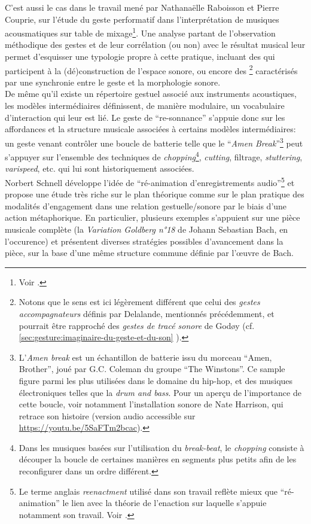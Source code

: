 \indent C'est aussi le cas dans le travail mené par Nathanaëlle Raboisson et Pierre Couprie, sur l'étude du geste performatif dans l'interprétation de musiques acousmatiques sur table de mixage\footnote{Voir \cite{raboisson_experience_2017}.}. Une analyse partant de l'observation méthodique des gestes et de leur corrélation (ou non) avec le résultat musical leur permet d'esquisser une typologie propre à cette pratique, incluant des  qui participent à la (dé)construction de l'espace sonore, ou encore des \footnote{Notons que le sens est ici légèrement différent que celui des \textit{gestes accompagnateurs} définis par Delalande, mentionnés précédemment, et pourrait être rapproché des \textit{gestes de tracé sonore} de Godøy (cf. \ref{sec:gesture:imaginaire-du-geste-et-du-son}
).} caractérisés par une synchronie entre le geste et la morphologie sonore.\\
\indent De même qu'il existe un répertoire gestuel associé aux instruments acoustiques, les modèles intermédiaires définissent, de manière modulaire, un vocabulaire d'interaction qui leur est lié. Le geste de ``re-sonnance'' s'appuie donc sur les affordances et la structure musicale associées à certains modèles intermédiaires: un geste venant contrôler une boucle de batterie telle que le ``\textit{Amen Break}''\footnote{L'\textit{Amen break} est un échantillon de batterie issu du morceau ``Amen, Brother'', joué par G.C. Coleman du groupe ``The Winstons''. Ce sample figure parmi les plus utilisées dans le domaine du hip-hop, et des musiques électroniques telles que la \textit{drum and bass}. Pour un aperçu de l'importance de cette boucle, voir notamment l'installation sonore  de Nate Harrison, qui retrace son histoire (version audio accessible sur \url{https://youtu.be/5SaFTm2bcac}).} peut s'appuyer sur l'ensemble des techniques de \textit{chopping}\footnote{Dans les musiques basées sur l'utilisation du \textit{break-beat}, le \textit{chopping} consiste à découper la boucle de certaines manières en segments plus petits afin de les reconfigurer dans un ordre différent.}, \textit{cutting}, filtrage, \textit{stuttering}, \textit{varispeed}, etc. qui lui sont historiquement associées.\\
\indent Norbert Schnell développe l'idée de ``ré-animation d'enregistrements audio''\footnote{Le terme anglais \textit{reenactment} utilisé dans son travail reflète mieux que ``ré-animation'' le lien avec la théorie de l'enaction sur laquelle s'appuie notamment son travail. Voir \cite{schnell_playing_2013}.} et propose une étude très riche sur le plan théorique comme sur le plan pratique des modalités d'engagement dans une relation gestuelle/sonore par le biais d'une action métaphorique. En particulier, plusieurs exemples s'appuient sur une pièce musicale complète (la \textit{Variation Goldberg n°18} de Johann Sebastian Bach, en l'occurence) et présentent diverses stratégies possibles d'avancement dans la pièce, sur la base d'une même structure commune définie par l'œuvre de Bach.


